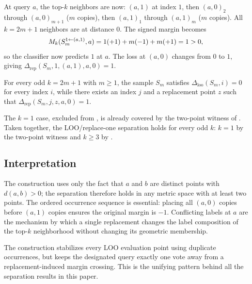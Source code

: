 At query $a$, the top-$k$ neighbors are now: $(a,1)$ at index $1$, then
$(a,0)_2$ through $(a,0)_{m+1}$ ($m$ copies), then $(a,1)_1$ through
$(a,1)_m$ ($m$ copies).  All $k = 2m+1$ neighbors are at distance $0$.  The
signed margin becomes
\[
M_k(S_m^{1 \leftarrow (a,1)}, a) = 1(+1) + m(-1) + m(+1) = 1 > 0,
\]
so the classifier now predicts $1$ at $a$.  The loss at $(a,0)$ changes from
$0$ to $1$, giving $\Delta_{\mathrm{rep}}(S_m, 1, (a,1), a, 0) = 1$.

\begin{theorem}
\label{thm:odd-k-separation}
For every odd $k = 2m+1$ with $m \ge 1$, the sample $S_m$ satisfies
$\Delta_{\mathrm{loo}}(S_m, i) = 0$ for every index $i$, while there exists an
index $j$ and a replacement point $z$ such that $\Delta_{\mathrm{rep}}(S_m, j,
z, a, 0) = 1$.
\end{theorem}

The $k=1$ case, excluded from , is already covered
by the two-point witness of .  Taken together, the
LOO/replace-one separation holds for every odd $k$: $k=1$ by the two-point
witness and $k \ge 3$ by .

\subsection{Interpretation}

The construction uses only the fact that $a$ and $b$ are distinct points with
$d(a,b) > 0$; the separation therefore holds in any metric space with at least
two points.  The ordered occurrence sequence is essential: placing all $(a,0)$
copies before $(a,1)$ copies ensures the original margin is $-1$.  Conflicting
labels at $a$ are the mechanism by which a single replacement changes the label
composition of the top-$k$ neighborhood without changing its geometric
membership.

The construction stabilizes every LOO evaluation point using duplicate
occurrences, but keeps the designated query exactly one vote away from a
replacement-induced margin crossing.  This is the unifying pattern behind all
the separation results in this paper.

